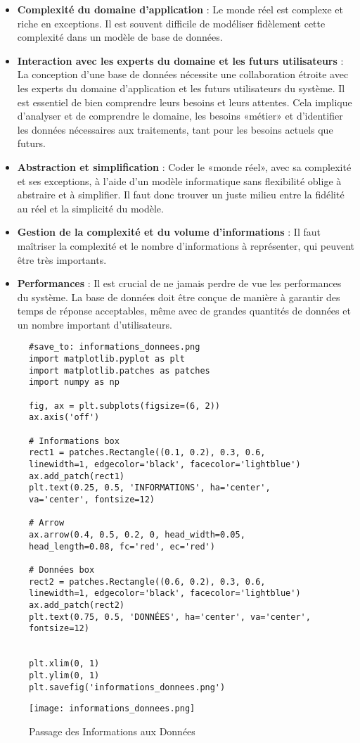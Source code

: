 \documentclass{article}
\begin{document}
\begin{itemize}
    \item \textbf{Complexité du domaine d'application} :  Le monde réel est complexe et riche en exceptions.  Il est souvent difficile de modéliser fidèlement cette complexité dans un modèle de base de données.
    \item \textbf{Interaction avec les experts du domaine et les futurs utilisateurs} :  La conception d'une base de données nécessite une collaboration étroite avec les experts du domaine d'application et les futurs utilisateurs du système.  Il est essentiel de bien comprendre leurs besoins et leurs attentes.  Cela implique d'analyser et de comprendre le domaine, les besoins «métier» et d'identifier les données nécessaires aux traitements, tant pour les besoins actuels que futurs.
    \item \textbf{Abstraction et simplification} :  Coder le «monde réel», avec sa complexité et ses exceptions, à l'aide d'un modèle informatique sans flexibilité oblige à abstraire et à simplifier.  Il faut donc trouver un juste milieu entre la fidélité au réel et la simplicité du modèle.
    \item \textbf{Gestion de la complexité et du volume d'informations} :  Il faut maîtriser la complexité et le nombre d'informations à représenter, qui peuvent être très importants.
    \item \textbf{Performances} :  Il est crucial de ne jamais perdre de vue les performances du système.  La base de données doit être conçue de manière à garantir des temps de réponse acceptables, même avec de grandes quantités de données et un nombre important d'utilisateurs.
\end{itemize}

\begin{figure}[h]
    \centering
    \begin{verbatim}
#save_to: informations_donnees.png
import matplotlib.pyplot as plt
import matplotlib.patches as patches
import numpy as np

fig, ax = plt.subplots(figsize=(6, 2))
ax.axis('off')

# Informations box
rect1 = patches.Rectangle((0.1, 0.2), 0.3, 0.6, linewidth=1, edgecolor='black', facecolor='lightblue')
ax.add_patch(rect1)
plt.text(0.25, 0.5, 'INFORMATIONS', ha='center', va='center', fontsize=12)

# Arrow
ax.arrow(0.4, 0.5, 0.2, 0, head_width=0.05, head_length=0.08, fc='red', ec='red')

# Données box
rect2 = patches.Rectangle((0.6, 0.2), 0.3, 0.6, linewidth=1, edgecolor='black', facecolor='lightblue')
ax.add_patch(rect2)
plt.text(0.75, 0.5, 'DONNÉES', ha='center', va='center', fontsize=12)


plt.xlim(0, 1)
plt.ylim(0, 1)
plt.savefig('informations_donnees.png')

    \end{verbatim}
    \texttt{[image: informations\_donnees.png]}
    \caption{Passage des Informations aux Données}
    \label{fig:info_donnees}
\end{figure}
\end{document}
